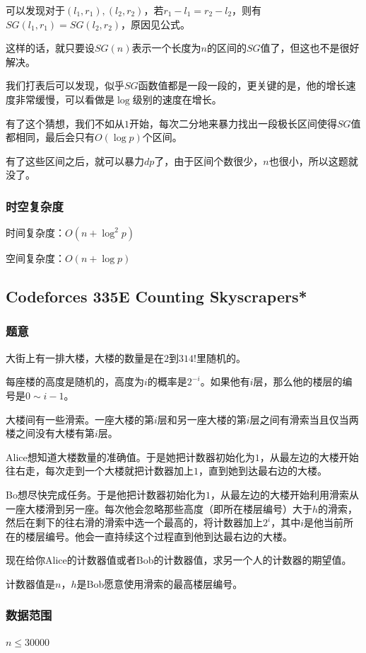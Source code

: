\documentclass{ctexart}
\begin{document}
可以发现对于$(l_1,r_1),(l_2,r_2)$，若$r_1-l_1=r_2-l_2$，则有$SG(l_1,r_1)=SG(l_2,r_2)$，原因见公式。

这样的话，就只要设$SG(n)$表示一个长度为$n$的区间的$SG$值了，但这也不是很好解决。

我们打表后可以发现，似乎$SG$函数值都是一段一段的，更关键的是，他的增长速度非常缓慢，可以看做是$\log$级别的速度在增长。

有了这个猜想，我们不如从$1$开始，每次二分地来暴力找出一段极长区间使得$SG$值都相同，最后会只有$O(\log p)$个区间。

有了这些区间之后，就可以暴力$dp$了，由于区间个数很少，$n$也很小，所以这题就没了。
\subsubsection{时空复杂度}
时间复杂度：$O(n+\log^2 p)$

空间复杂度：$O(n+\log p)$
\subsection{Codeforces 335E Counting Skyscrapers*}
\subsubsection{题意}
大街上有一排大楼，大楼的数量是在$2$到$314!$里随机的。

每座楼的高度是随机的，高度为$i$的概率是$2^{-i}$。如果他有$i$层，那么他的楼层的编号是$0 \sim i-1$。

大楼间有一些滑索。一座大楼的第$i$层和另一座大楼的第$i$层之间有滑索当且仅当两楼之间没有大楼有第$i$层。

Alice想知道大楼数量的准确值。于是她把计数器初始化为$1$，从最左边的大楼开始往右走，每次走到一个大楼就把计数器加上$1$，直到她到达最右边的大楼。

Bo想尽快完成任务。于是他把计数器初始化为$1$，从最左边的大楼开始利用滑索从一座大楼滑到另一座。每次他会忽略那些高度（即所在楼层编号）大于$h$的滑索，然后在剩下的往右滑的滑索中选一个最高的，将计数器加上$2^i$，其中$i$是他当前所在的楼层编号。他会一直持续这个过程直到他到达最右边的大楼。

现在给你Alice的计数器值或者Bob的计数器值，求另一个人的计数器的期望值。

计数器值是$n$，$h$是Bob愿意使用滑索的最高楼层编号。
\subsubsection{数据范围}
$n \le 30000$
\end{document}
